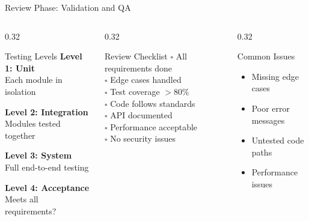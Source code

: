 \documentclass[aspectratio=169,10pt]{beamer}
\begin{document}
\begin{frame}{Review Phase: Validation and QA}
    \begin{columns}[T]
        \begin{column}{0.32\textwidth}
            \begin{block}{Testing Levels}
                \textbf{Level 1: Unit}\\
                Each module in isolation

                \textbf{Level 2: Integration}\\
                Modules tested together

                \textbf{Level 3: System}\\
                Full end-to-end testing

                \textbf{Level 4: Acceptance}\\
                Meets all requirements?
            \end{block}
        \end{column}
        \begin{column}{0.32\textwidth}
            \begin{block}{Review Checklist}
                \textcolor{UofSCGarnet}{$\square$} All requirements done\\
                \textcolor{UofSCGarnet}{$\square$} Edge cases handled\\
                \textcolor{UofSCGarnet}{$\square$} Test coverage $>$80\%\\
                \textcolor{UofSCGarnet}{$\square$} Code follows standards\\
                \textcolor{UofSCGarnet}{$\square$} API documented\\
                \textcolor{UofSCGarnet}{$\square$} Performance acceptable\\
                \textcolor{UofSCGarnet}{$\square$} No security issues
            \end{block}
        \end{column}
        \begin{column}{0.32\textwidth}
            \begin{alertblock}{Common Issues}
                \begin{itemize}
                    \item Missing edge cases
                    \item Poor error messages
                    \item Untested code paths
                    \item Performance issues

\end{itemize}
\end{alertblock}
\end{column}
\end{columns}
\end{frame}
\end{document}
